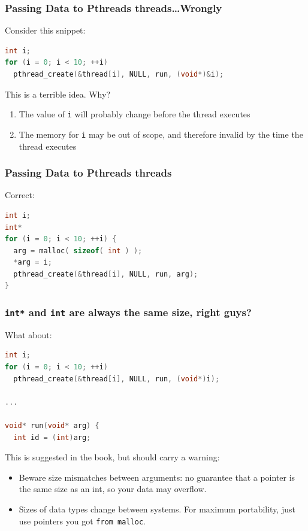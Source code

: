 \begin{frame}[fragile]
  \frametitle{Passing Data to Pthreads threads\ldots Wrongly}


Consider this snippet:
\vfill
\begin{lstlisting}[language=C]
int i;
for (i = 0; i < 10; ++i)
  pthread_create(&thread[i], NULL, run, (void*)&i);
\end{lstlisting}
  \vfill
  This is a \alert{terrible} idea. Why?
  \vfill
  \begin{enumerate}
    \item<2-> The value of {\tt i} will probably change before the thread executes
    \item<2-> The memory for {\tt i} may be out of scope, and therefore invalid by
          the time the thread executes
  \end{enumerate}


\end{frame}

\begin{frame}[fragile]
  \frametitle{Passing Data to Pthreads threads}
  
Correct:


\begin{lstlisting}[language=C]
int i;
int*
for (i = 0; i < 10; ++i) {
  arg = malloc( sizeof( int ) );
  *arg = i;
  pthread_create(&thread[i], NULL, run, arg);
}
\end{lstlisting}


\end{frame}



\begin{frame}[fragile]
\frametitle{\texttt{int*} and \texttt{int} are always the same size, right guys?}

What about:
\begin{lstlisting}[language=C]
int i;
for (i = 0; i < 10; ++i)
  pthread_create(&thread[i], NULL, run, (void*)i);

...

void* run(void* arg) {
  int id = (int)arg;
\end{lstlisting}
  \vfill
  This is suggested in the book, but should carry a warning:

  \vfill
  \begin{itemize}
    \item<2-> Beware size mismatches between arguments: 
      no guarantee that a pointer is the same size as an int, so your data
      may overflow.
    \item<2-> Sizes of data types change between systems. For maximum
      portability, just use pointers you got {\tt from malloc}.
  \end{itemize}


\end{frame}

